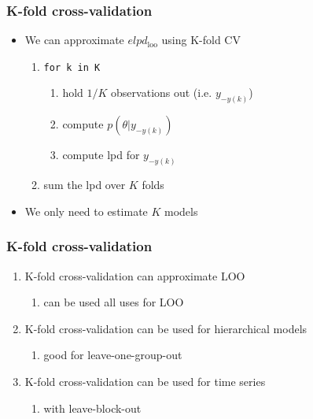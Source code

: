 \documentclass[10pt]{beamer}
\begin{document}
\begin{frame}{}

\frametitle{K-fold cross-validation}

\begin{itemize}
\item We can approximate $elpd_\text{loo}$ using K-fold CV
\pause
\begin{enumerate}
\item \texttt{for k in K}
  \begin{enumerate}
  \item hold $1/K$ observations out (i.e. $y_{-y(k)}$)
  \item compute $p(\theta|y_{-y(k)})$
  \item compute lpd for $y_{-y(k)}$
  \end{enumerate}
\item sum the lpd over $K$ folds
\end{enumerate}
\pause
\item We only need to estimate $K$ models
\end{itemize}

\end{frame}

\begin{frame}{}

\frametitle{K-fold cross-validation}

\begin{enumerate}
\item K-fold cross-validation can approximate LOO
  \begin{enumerate}
    \item can be used all uses for LOO
  \end{enumerate}
\item K-fold cross-validation can be used for hierarchical models
  \begin{enumerate}
    \item good for leave-one-group-out
  \end{enumerate}
\item K-fold cross-validation can be used for time series
  \begin{enumerate}
    \item with leave-block-out
  \end{enumerate}
\end{enumerate}

\end{frame}
\end{document}

